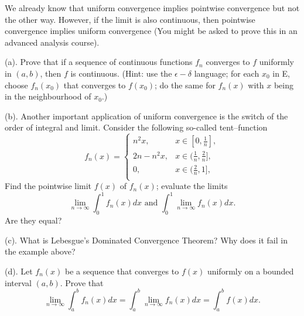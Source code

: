 \documentclass[6pt]{article}
\numberwithin{equation}{section}
\begin{document}
\begin{enumerate}
We already know that uniform convergence implies pointwise convergence but not the other way.  However, if the limit is also continuous, then pointwise convergence implies uniform convergence (You might be asked to prove this in an advanced analysis course).

(a).  Prove that if a sequence of continuous functions $f_n$ converges to $f$ uniformly in $(a,b)$, then $f$ is continuous.  (Hint: use the $\epsilon-\delta$ language; for each $x_0$ in E, choose $f_n(x_0)$ that converges to $f(x_0)$; do the same for $f_n(x)$ with $x$ being in the neighbourhood of $x_0$.)

(b).  Another important application of uniform convergence is the switch of the order of integral and limit.  Consider the following so-called tent--function
\begin{equation}f_n(x)=
\left\{
\begin{array}{ll}
n^2x,& x\in[0,\frac{1}{n}],\\
2n-n^2x,& x\in(\frac{1}{n},\frac{2}{n}],\\
0,& x\in(\frac{2}{n},1],\\
\end{array}
\right.
\end{equation}
Find the pointwise limit $f(x)$ of $f_n(x)$;  evaluate the limits \[\lim_{n\rightarrow \infty} \int_0^1 f_n(x)dx \text{ and }\int_0^1 \lim_{n\rightarrow \infty} f_n(x)dx.\]  Are they equal?

(c).  What is Lebesgue's Dominated Convergence Theorem? Why does it fail in the example above?

(d).  Let $f_n(x)$ be a sequence that converges to $f(x)$ uniformly on a bounded interval $(a,b)$.  Prove that
\[\lim_{n\rightarrow \infty} \int_a^b f_n(x)dx=\int_a^b \lim_{n\rightarrow \infty} f_n(x)dx=\int_a^b f (x)dx.\]

\end{enumerate}
\end{document}
